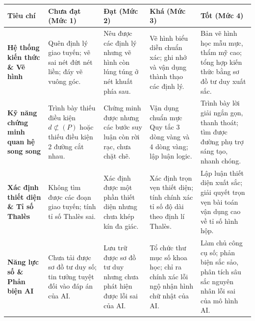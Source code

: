 \documentclass[12pt, a4paper]{article}
\begin{document}
\begin{center}
\small
\begin{tabularx}{\textwidth}{|p{2.8cm}|X|X|X|X|}
\hline
\textbf{Tiêu chí} & \textbf{Chưa đạt (Mức 1)} & \textbf{Đạt (Mức 2)} & \textbf{Khá (Mức 3)} & \textbf{Tốt (Mức 4)} \\ \hline
\textbf{Hệ thống kiến thức \& Vẽ hình} & Quên định lý giao tuyến; vẽ sai nét đứt nét liền; đáy vẽ vuông góc. & Nêu được các định lý nhưng vẽ hình còn lúng túng ở nét khuất phía sau. & Vẽ hình biểu diễn chuẩn xác; ghi nhớ và vận dụng thành thạo các định lý. & Bản vẽ hình học mẫu mực, thẩm mỹ cao; tổng hợp kiến thức bằng sơ đồ tư duy xuất sắc. \\ \hline
\textbf{Kỹ năng chứng minh quan hệ song song} & Trình bày thiếu điều kiện $d \not\subset (P)$ hoặc thiếu điều kiện 2 đường cắt nhau. & Chứng minh được nhưng các bước suy luận còn rời rạc, chưa chặt chẽ. & Vận dụng chuẩn mực Quy tắc 3 dòng vàng và 4 dòng vàng; lập luận logic. & Trình bày lời giải ngắn gọn, thanh thoát; tìm được đường phụ trợ sáng tạo, nhanh chóng. \\ \hline
\textbf{Xác định thiết diện \& Tỉ số Thalès} & Không tìm được các đoạn giao tuyến; tính tỉ số Thalès sai. & Xác định được một phần thiết diện nhưng chưa khép kín đa giác. & Xác định trọn vẹn thiết diện; tính chính xác tỉ số độ dài theo định lí Thalès. & Lập luận thiết diện xuất sắc; giải quyết trọn vẹn bài toán vận dụng cao về tỉ số hình hộp. \\ \hline
\textbf{Năng lực số \& Phản biện AI} & Chưa tải được sơ đồ tư duy số; tin tưởng tuyệt đối vào đáp án của AI. & Lưu trữ được sơ đồ tư duy nhưng chưa phát hiện được lỗi sai của AI. & Tổ chức thư mục số khoa học; chỉ ra chính xác lỗi ngộ nhận hình chữ nhật của AI. & Làm chủ công cụ số; phản biện sắc sảo, phân tích sâu sắc nguyên nhân lỗi sai của mô hình AI. \\ \hline
\end{tabularx}
\end{center}
\end{document}
